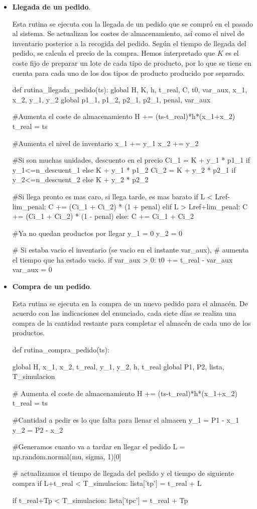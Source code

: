 \documentclass[a4paper,12pt]{article}
\begin{document}
\begin{itemize}
	\item \textbf{Llegada de un pedido}. 
	
	Esta rutina se ejecuta con la llegada de un pedido que se compró en el pasado al sistema. Se actualizan los costes de almacenamiento, así como el nivel de inventario posterior a la recogida del pedido. Según el tiempo de llegada del pedido, se calcula el precio de la compra.
	Hemos interpretado que $K$ es el coste fijo de preparar un lote de cada tipo de producto, por lo que se tiene en cuenta para cada uno de los dos tipos de producto producido por separado.
	
	\begin{python}
def rutina_llegada_pedido(ts):
	global H, K, h, t_real, C, t0, var_aux, x_1, x_2, y_1, y_2
	global p1_1, p1_2, p2_1, p2_1, penal, var_aux
	
	#Aumenta el coste de almacenamiento
	H += (ts-t_real)*h*(x_1+x_2)
	t_real = ts
	
	#Aumenta el nivel de inventario
	x_1 += y_1
	x_2 += y_2
	
	#Si son muchas unidades, descuento en el precio
	Ci_1 = K + y_1 * p1_1 if y_1<=n_descuent_1 else K + y_1 * p1_2
	Ci_2 = K + y_2 * p2_1 if y_2<=n_descuent_2 else K + y_2 * p2_2
	
	#Si llega pronto es mas caro, si llega tarde, es mas barato
	if L < Lref-lim_penal:
		C += (Ci_1 + Ci_2) * (1 + penal)
	elif L > Lref+lim_penal:
		C += (Ci_1 + Ci_2) * (1 - penal)
	else:
		C += Ci_1 + Ci_2
		
	#Ya no quedan productos por llegar
	y_1 = 0
	y_2 = 0
	
	# Si estaba vacio el inventario (se vacio en el instante var_aux),
	# aumenta el tiempo que ha estado vacio.
	if var_aux > 0:
		t0 += t_real - var_aux
		var_aux = 0
	\end{python}
	
	\item \textbf{Compra de un pedido}. 
	
	Esta rutina se ejecuta en la compra de un nuevo pedido para el almacén. De acuerdo con las indicaciones del enunciado, cada siete días se realiza una compra de la cantidad restante para completar el almacén de cada uno de los productos. 
	
	\begin{python}
def rutina_compra_pedido(ts):

	global H, x_1, x_2, t_real, y_1, y_2, h, t_real
	global P1, P2, lista, T_simulacion
	
	# Aumenta el coste de almacenamiento
	H += (ts-t_real)*h*(x_1+x_2)
	t_real = ts
	
	#Cantidad a pedir es lo que falta para llenar el almacen
	y_1 = P1 - x_1
	y_2 = P2 - x_2
	
	#Generamos cuanto va a tardar en llegar el pedido
	L = np.random.normal(mu, sigma, 1)[0]
	
	# actualizamos el tiempo de llegada del pedido y el tiempo de siguiente compra
	if L+t_real < T_simulacion:
		lista['tp'] = t_real + L
	
	if t_real+Tp < T_simulacion:
		lista['tpc'] = t_real + Tp
	\end{python}
	
	\end{itemize}
	
\end{document}
